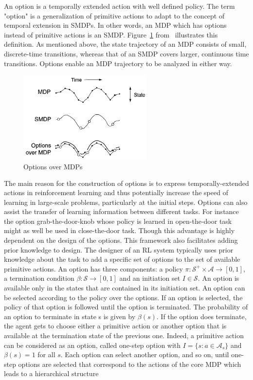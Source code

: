 An option is a temporally extended action with well defined policy. The term "option" is a generalization of primitive actions to adapt to the concept of temporal extension in SMDPs. In other words, an MDP  which has options instead of primitive actions is an SMDP. Figure~\ref{fig:options} from~\cite{Sutton1999BetweenMA} illustrates this definition. As mentioned above, the state trajectory of an MDP consists of small, discrete-time transitions, whereas that of an SMDP covers larger, continuous time transitions. Options enable an MDP trajectory to be analyzed in either way.
\begin{figure}[t]
      \centering
      \includegraphics[width = 0.6\textwidth]{./pictures/options.png}
      \caption{Options over MDPs}
      \label{fig:options} 
\end{figure}
The main reason for the construction of options is to express temporally-extended actions in reinforcement learning and thus potentially increase the speed of learning in large-scale problems, particularly at the initial steps. Options can also assist the transfer of learning information between different tasks. For instance the option grab-the-door-knob whose policy is learned in open-the-door task might as well be used in close-the-door task. Though this advantage is highly dependent on the design of the options. This framework also facilitates adding prior knowledge to design. The designer of an RL system typically uses prior knowledge about the task to add a specific set of options to the set of available primitive actions.
An option has three components: a policy $\pi : \mathcal{S}^+\times\mathcal{A} \rightarrow \left[0,1\right]$, a termination condition $\beta: \mathcal{S} \rightarrow \left[0,1\right]$ and an initiation set $I \in \mathcal{S}$. An option is available only in the states that are contained in its initiation set. An option can be selected according to the policy over the options. If an option is selected, the policy of that option is followed until the option is terminated. The probability of an option to terminate in state s is given by $\beta(s)$. If the option does terminate, the agent gets to choose either a primitive action or another option that is available at the termination state of the previous one. Indeed, a primitive action can be considered as an option, called one-step option with $I=\{s: a \in \mathcal{A}_s\}$ and $\beta(s) = 1$ for all $s$. Each option can select another option, and so on, until one-step options are selected that correspond to the actions of the core MDP which leads to a hierarchical structure

